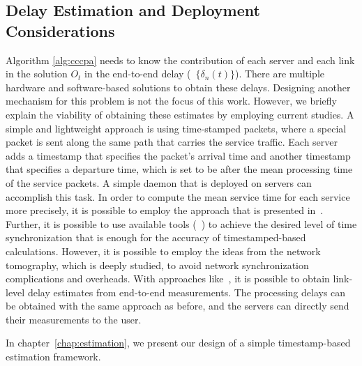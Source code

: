 \subsection{Delay Estimation and Deployment Considerations}
\label{section:estimation}
Algorithm \ref{alg:cccpa} needs to know the contribution of each server and each link in the solution $O_{t}$ in the end-to-end delay (\ie\ $\{\delta_n(t)\}$). There are multiple hardware and software-based solutions to obtain these delays. Designing another mechanism for this problem is not the focus of this work. However, we briefly explain the viability of obtaining these estimates by employing current studies. A simple and lightweight approach is using time-stamped packets, where a special packet is sent along the same path that carries the service traffic. Each server adds a timestamp that specifies the packet's arrival time and another timestamp that specifies a departure time, which is set to be after the mean processing time of the service packets. A simple daemon that is deployed on servers can accomplish this task. In order to compute the mean service time for each service more precisely, it is possible to employ the approach that is presented in~\cite{koMON}. Further, it is possible to use available tools (\eg\ \cite{SDNTimeSyn}) to achieve the desired level of time synchronization that is enough for the accuracy of timestamped-based calculations. However, it is possible to employ the ideas from the network tomography, which is deeply studied, to avoid network synchronization complications and overheads. With approaches like~\cite{SLAM}, it is possible to obtain link-level delay estimates from end-to-end measurements. The processing delays can be obtained with the same approach as before, and the servers can directly send their measurements to the user.  

In chapter~\ref{chap:estimation}, we present our design of a simple timestamp-based estimation framework.





